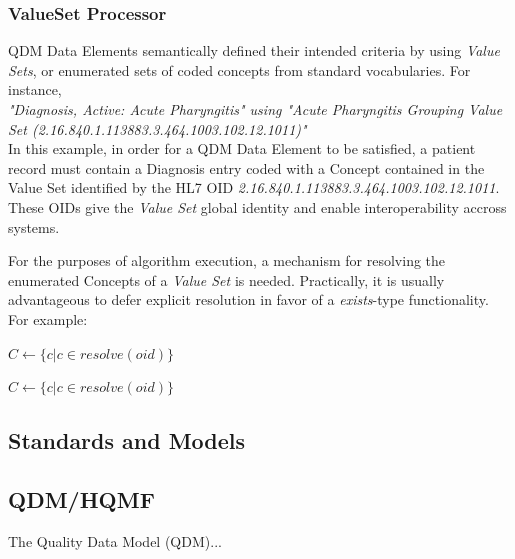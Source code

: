 \documentclass{amia}
\begin{document}
\subsubsection*{ValueSet Processor}
QDM Data Elements semantically defined their intended criteria by using \textit{Value Sets}, or enumerated sets of coded concepts from standard vocabularies. For instance,\\

\textit{"Diagnosis, Active: Acute Pharyngitis" using "Acute Pharyngitis Grouping Value Set (2.16.840.1.113883.3.464.1003.102.12.1011)"}\\

In this example, in order for a QDM Data Element to be satisfied, a patient record must contain a Diagnosis entry coded with a Concept contained in the Value Set identified by the HL7 OID \textit{2.16.840.1.113883.3.464.1003.102.12.1011}. These OIDs give the \textit{Value Set} global identity and enable interoperability accross systems\cite{steindel2010oids}.

For the purposes of algorithm execution, a mechanism for resolving the enumerated Concepts of a \textit{Value Set} is needed. Practically, it is usually advantageous to defer explicit resolution in favor of a \textit{exists}-type functionality. For example:

\begin{algorithm}
\begin{algorithmic}[1]
  \State $C \gets \{c | c \in resolve(oid)\}$
  \State {}
\EndProcedure
\end{algorithmic}
\end{algorithm}

\begin{algorithm}
\begin{algorithmic}[1]
  \State $C \gets \{c | c \in resolve(oid)\}$
  \State {}
\EndProcedure
\end{algorithmic}
\end{algorithm}


\subsection*{Standards and Models}
\subsection*{QDM/HQMF}
The Quality Data Model (QDM)\cite{behilngquality}...
\end{document}

